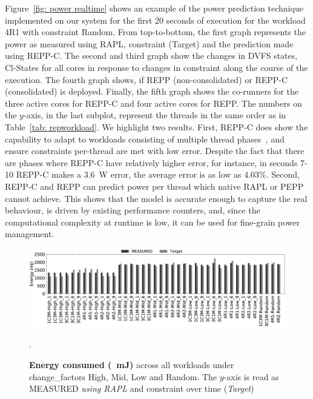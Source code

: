 Figure~\ref{fig: power realtime} shows an example of the power prediction technique
implemented on our system for the first 20 seconds of execution for the workload 4R1 with
constraint Random. From top-to-bottom, the first graph represents the power as measured
using RAPL, constraint (\textsf{Target}) and the prediction made using REPP-C. The second
and third graph show the changes in DVFS states, Cl-States for all cores in response to
changes in constraint along the course of the execution. The fourth graph shows, if REPP
(\textsf{non-consolidated}) or REPP-C (\textsf{consolidated}) is deployed.  Finally, the
fifth graph shows the co-runners for the three active cores for REPP-C and four active
cores for REPP. The numbers on the $y$-axis, in the last subplot, represent the threads in
the same order as in Table~\ref{tab: repworkload}.  We highlight two results. First,
REPP-C does show the capability to adapt to workloads consisting of multiple thread
phases~\citep{2006core2}, and ensure constraints per-thread are met with low error.
Despite the fact that there are phases where REPP-C have relatively higher error, for
instance, in seconds 7-10 REPP-C makes a \SI{3.6}{\watt} error, the average error is as
low as 4.03\%. Second, REPP-C and REPP can predict power per thread which native RAPL or
PEPP~\citep{Su:2014:POP:2742155.2742200} cannot achieve. This shows that the model is
accurate enough to capture the real behaviour, is driven by existing performance counters,
and, since the computational complexity at runtime is low, it can be used for fine-grain
power management. 

\begin{figure}[t]
   \centering
    \includegraphics[width=\textwidth]{Chapter3/Figs/consolidation/final-power.eps}
    \caption[Power prediction for multiprogrammed workloads with REPP-C]{ \textbf{Energy consumed (\SI{}{\milli\joule})} across all workloads under change\_factors High, Mid, Low and Random. The $y$-axis is read as MEASURED \textit{using RAPL} and constraint over time (\textit{Target})}.
    \label{fig: power workloads}
\end{figure}

